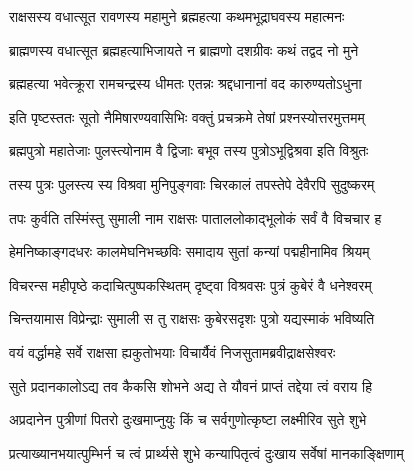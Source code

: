 
\vakta{}
\shrota{}
\tags{}
\notes{}

\storymeta





\twolineshloka
{राक्षसस्य वधात्सूत रावणस्य महामुने}
{ब्रह्महत्या कथमभूद्राघवस्य महात्मनः}%

\twolineshloka
{ब्राह्मणस्य वधात्सूत ब्रह्महत्याभिजायते}
{न ब्राह्मणो दशग्रीवः कथं तद्वद नो मुने}%

\twolineshloka
{ब्रह्महत्या भवेत्क्रूरा रामचन्द्रस्य धीमतः}
{एतन्नः श्रद्दधानानां वद कारुण्यतोऽधुना}%

\twolineshloka
{इति पृष्टस्ततः सूतो नैमिषारण्यवासिभिः}
{वक्तुं प्रचक्रमे तेषां प्रश्नस्योत्तरमुत्तमम्}%


\twolineshloka
{ब्रह्मपुत्रो महातेजाः पुलस्त्योनाम वै द्विजाः}
{बभूव तस्य पुत्रोऽभूद्विश्रवा इति विश्रुतः}%

\twolineshloka
{तस्य पुत्रः पुलस्त्य स्य विश्रवा मुनिपुङ्गवाः}
{चिरकालं तपस्तेपे देवैरपि सुदुष्करम्}%

\twolineshloka
{तपः कुर्वति तस्मिंस्तु सुमाली नाम राक्षसः}
{पाताललोकाद्भूलोकं सर्वं वै विचचार ह}%

\twolineshloka
{हेमनिष्काङ्गदधरः कालमेघनिभच्छविः}
{समादाय सुतां कन्यां पद्महीनामिव श्रियम्}%

\twolineshloka
{विचरन्स महीपृष्ठे कदाचित्पुष्पकस्थितम्}
{दृष्ट्वा विश्रवसः पुत्रं कुबेरं वै धनेश्वरम्}%

\twolineshloka
{चिन्तयामास विप्रेन्द्राः सुमाली स तु राक्षसः}
{कुबेरसदृशः पुत्रो यद्यस्माकं भविष्यति}%

\twolineshloka
{वयं वर्द्धामहे सर्वे राक्षसा ह्यकुतोभयाः}
{विचार्यैवं निजसुतामब्रवीद्राक्षसेश्वरः}%

\twolineshloka
{सुते प्रदानकालोऽद्य तव कैकसि शोभने}
{अद्य ते यौवनं प्राप्तं तद्देया त्वं वराय हि}%

\twolineshloka
{अप्रदानेन पुत्रीणां पितरो दुःखमाप्नुयुः}
{किं च सर्वगुणोत्कृष्टा लक्ष्मीरिव सुते शुभे}%

\twolineshloka
{प्रत्याख्यानभयात्पुम्भिर्न च त्वं प्रार्थ्यसे शुभे}
{कन्यापितृत्वं दुःखाय सर्वेषां मानकाङ्क्षिणाम्}%

